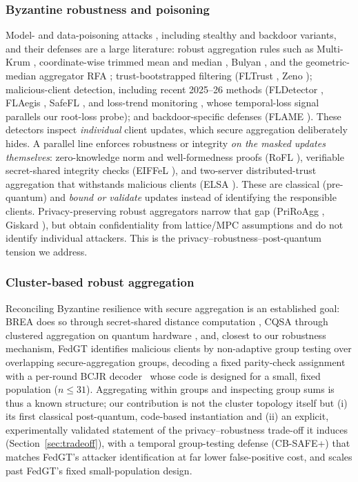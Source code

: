 \documentclass[lettersize,journal]{IEEEtran}
\begin{document}
\subsubsection{Byzantine robustness and poisoning} Model- and data-poisoning attacks
\cite{fang2020,shejwalkar2021,tolpegin2020}, including stealthy \cite{baruch2019}
and backdoor \cite{bagdasaryan2020,wangtails2020} variants, and their defenses are a
large literature: robust aggregation rules such as Multi-Krum \cite{blanchard2017},
coordinate-wise trimmed mean and median \cite{yin2018}, Bulyan \cite{bulyan}, and the
geometric-median aggregator RFA \cite{rfa}; trust-bootstrapped filtering
(FLTrust \cite{fltrust}, Zeno \cite{zeno}); malicious-client detection, including
recent 2025--26 methods (FLDetector \cite{fldetector2022}, FLAegis \cite{flaegis2025},
SafeFL \cite{safefl2025}, and loss-trend monitoring \cite{flltd2026}, whose
temporal-loss signal parallels our root-loss probe); and backdoor-specific defenses
(FLAME \cite{flame2022}). These detectors inspect \emph{individual} client updates,
which secure aggregation deliberately hides. A parallel line enforces robustness or
integrity \emph{on the masked updates themselves}: zero-knowledge norm and
well-formedness proofs (RoFL \cite{rofl}), verifiable secret-shared integrity checks
(EIFFeL \cite{eiffel}), and two-server distributed-trust aggregation that withstands
malicious clients (ELSA \cite{elsa}). These are classical (pre-quantum) and
\emph{bound or validate} updates instead of identifying the responsible clients.
Privacy-preserving robust aggregators
narrow that gap (PriRoAgg \cite{priroagg2024}, Giskard \cite{giskard2026}), but obtain
confidentiality from lattice/MPC assumptions and do not
identify individual attackers. This is the privacy--robustness--post-quantum tension we
address.

\subsubsection{Cluster-based robust aggregation} Reconciling Byzantine resilience
with secure aggregation is an established goal: BREA does so through
secret-shared distance computation \cite{brea2021}, CQSA through clustered
aggregation on quantum hardware \cite{cqsa2026}, and, closest to our robustness
mechanism, FedGT \cite{fedgt} identifies malicious clients by non-adaptive group
testing \cite{dorfman1943,aldridge2019} over overlapping secure-aggregation groups,
decoding a fixed parity-check assignment with a per-round BCJR decoder~\cite{bcjr} whose code is
designed for a small, fixed population ($n{\le}31$). Aggregating within groups and
inspecting group sums is thus a known structure; our contribution is not the cluster
topology itself but (i) its first classical post-quantum, code-based
instantiation and (ii) an explicit, experimentally validated statement of the
privacy--robustness trade-off it induces (Section~\ref{sec:tradeoff}), with a
temporal group-testing defense (CB-SAFE+) that matches FedGT's attacker
identification at far lower false-positive cost, and scales past FedGT's fixed
small-population design.
\end{document}
